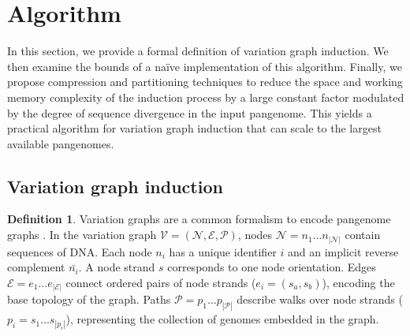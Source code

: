 \documentclass{bioinfo}
\theoremstyle{definition}
\newtheorem{definition}{Definition}[section]
\begin{document}




\section{Algorithm}
\label{sec:algorithm}

In this section, we provide a formal definition of variation graph induction.
We then examine the bounds of a na\"{i}ve implementation of this algorithm.
Finally, we propose compression and partitioning techniques to reduce the space and working memory complexity of the induction process by a large constant factor modulated by the degree of sequence divergence in the input pangenome.
This yields a practical algorithm for variation graph induction that can scale to the largest available pangenomes.

\subsection{Variation graph induction}

\begin{definition}
\label{def:vg}
Variation graphs are a common formalism to encode pangenome graphs \citep{Garrison_2019_thesis}.
In the variation graph $\mathcal{V} = (\mathcal{N}, \mathcal{E}, \mathcal{P})$, nodes $\mathcal{N} = n_1\ldots n_{|\mathcal{N}|}$ contain sequences of DNA.
Each node $n_i$ has a unique identifier $i$ and an implicit reverse complement $\bar{n_i}$.
A node strand $s$ corresponds to one node orientation.
Edges $\mathcal{E} = e_1\ldots e_{|\mathcal{E}|}$ connect ordered pairs of node strands ($e_i = ( s_a, s_b )$), encoding the base topology of the graph.
Paths $\mathcal{P} = p_1\ldots p_{|\mathcal{P}|}$ describe walks over node strands ($p_i = s_1 \ldots s_{|p_i|}$), representing the collection of genomes embedded in the graph.
\end{definition}
\end{document}
